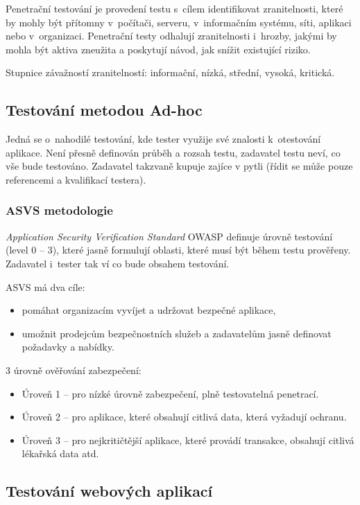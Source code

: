 Penetrační testování je provedení testu s~cílem identifikovat zranitelnosti, které by mohly být přítomny v~počítači, serveru, v~informačním systému, síti, aplikaci nebo v~organizaci.
Penetrační testy odhalují zranitelnosti i~hrozby, jakými by mohla být aktiva zneužita a poskytují návod, jak snížit existující riziko.

Stupnice závažností zranitelností: informační, nízká, střední, vysoká, kritická.


\subsection{Testování metodou Ad-hoc}

Jedná se o~nahodilé testování, kde tester využije své znalosti k~otestování aplikace.
Není přesně definován průběh a rozsah testu, zadavatel testu neví, co vše bude testováno.
Zadavatel takzvaně kupuje zajíce v pytli (řídit se může pouze referencemi a kvalifikací testera).


\subsubsection{ASVS metodologie}

\textit{Application Security Verification Standard} OWASP definuje úrovně testování (level 0 -- 3), které jasně formulují oblasti, které musí být během testu prověřeny.
Zadavatel i~tester tak ví co bude obsahem testování.

ASVS má dva cíle:
\begin{itemize}
    \item pomáhat organizacím vyvíjet a udržovat bezpečné aplikace,
    \item umožnit prodejcům bezpečnostních služeb a zadavatelům jasně definovat požadavky a nabídky.
\end{itemize}

3 úrovně ověřování zabezpečení:
\begin{itemize}
    \item Úroveň 1 -- pro nízké úrovně zabezpečení, plně testovatelná penetrací.
    \item Úroveň 2 -- pro aplikace, které obsahují citlivá data, která vyžadují ochranu.
    \item Úroveň 3 -- pro nejkritičtější aplikace, které provádí transakce, obsahují citlivá lékařská data atd.
\end{itemize}


\subsection{Testování webových aplikací}

